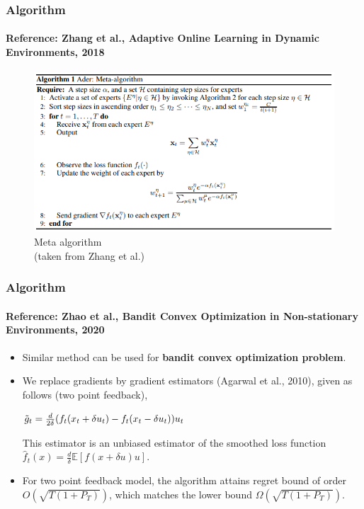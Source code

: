 \documentclass{beamer}
\begin{document}
    \begin{frame}
        \frametitle{Algorithm}
        \framesubtitle{Reference: Zhang et al., Adaptive Online Learning in Dynamic Environments, 2018}
        \begin{figure}
            \centering
            \includegraphics[scale=0.6]{images/ader-meta.PNG}
            \caption{Meta algorithm \\ (taken from Zhang et al.)}
            \label{fig:comb}
        \end{figure}
    \end{frame}
    \begin{frame}
        \frametitle{Algorithm}
        \framesubtitle{Reference: Zhao et al., Bandit Convex Optimization in Non-stationary Environments, 2020} 
        \begin{itemize}
            \item Similar method can be used for \textbf{bandit convex optimization problem}.
            \item We replace gradients by gradient estimators (Agarwal et al., 2010), given as follows (two point feedback),
            \begin{center}
                $\Tilde{g}_{t} = \frac{d}{2\delta}(f_{t}(x_t + \delta u_t) - f_{t}(x_t - \delta u_t))u_t$
            \end{center}
            This estimator is an unbiased estimator of the smoothed loss function $\hat{f}_{t}(x) = \frac{d}{\delta}\mathbb{E}[f(x + \delta u)u]$.
            \item For two point feedback model, the algorithm attains regret bound of order $O(\sqrt{T(1+P_T)})$, which matches the lower bound $\Omega(\sqrt{T(1+P_T)})$.
        \end{itemize}    
    \end{frame}
\end{document}
